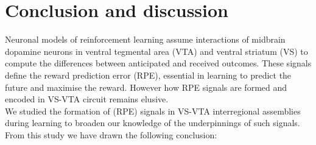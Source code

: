 \chapter{Conclusion and discussion}
\label{chap:Conclusion}
Neuronal models of reinforcement learning assume interactions of midbrain dopamine neurons in ventral tegmental area (VTA) and ventral striatum (VS) to compute the differences between anticipated and received outcomes. These signals define the reward prediction error (RPE), essential in learning to predict the future and maximise the reward. However how RPE signals are formed and encoded in VS-VTA circuit remains elusive.\\We studied the formation of (RPE) signals in VS-VTA interregional assemblies during learning to broaden our knowledge of the underpinnings of such signals. From this study we have drawn the following conclusion:
